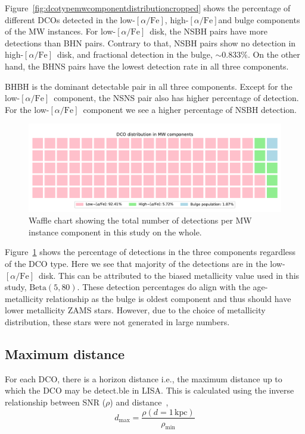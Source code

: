 \documentclass[journal, twocolumns]{IEEEtran}
\newcommand{\lowalpha}{low-$[\alpha/\text{Fe}]$}
\newcommand{\highalpha}{high-$[\alpha/\text{Fe}]$}
\begin{document}
    Figure~\ref{fig:dcotypemwcomponentdistributioncropped} shows the percentage of different DCOs detected in the \lowalpha, \highalpha and bulge components of the MW instances.
    For \lowalpha\ disk, the NSBH pairs have more detections than BHN pairs.
    Contrary to that, NSBH pairs show no detection in \highalpha\ disk, and fractional detection in the bulge, $\sim0.833\%$.
    On the other hand, the BHNS pairs have the lowest detection rate in all three components.

    BHBH is the dominant detectable pair in all three components.
    Except for the \lowalpha\ component, the NSNS pair also has higher percentage of detection.
    For the \lowalpha\ component we see a higher percentage of NSBH detection.
    \begin{figure}[!h]%
        \centering
        \includegraphics[width=\columnwidth]{analysis_data/004__images_for_latex/dco_type_MW_distribution}
        \caption{Waffle chart showing the total number of detections per MW instance component in this study on the whole.}
        \label{fig:dcotypemwdistribution}
    \end{figure}%

    Figure~\ref{fig:dcotypemwdistribution} shows the percentage of detections in the three components regardless of the DCO type.
    Here we see that majority of the detections are in the \lowalpha\ disk.
    This can be attributed to the biased metallicity value used in this study, $\text{Beta}(5, 80)$.
    These detection percentages do align with the age-metallicity relationship as the bulge is oldest component and thus should have lower metallicity ZAMS stars.
    However, due to the choice of metallicity distribution, these stars were not generated in large numbers.

    \subsection{Maximum distance}\label{subsec:maximum-distance}
    For each DCO, there is a horizon distance i.e., the maximum distance up to which the DCO may be detect\@.ble in LISA\@.
    This is calculated using the inverse relationship between SNR ($\rho$) and distance~\cite{Lau2020},
    \begin{equation}
        \label{eq:eq1}
        d_\text{max}=\frac{\rho(d=1\,\text{kpc})}{\rho_\text{min}}
    \end{equation}
\end{document}
